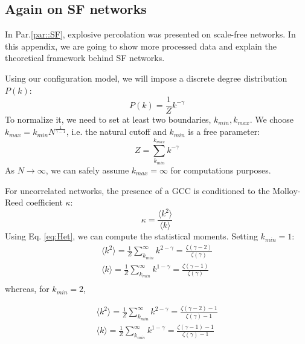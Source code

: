 \subsection{Again on SF networks}
In Par.\ref{par::SF}, explosive percolation was presented on scale-free networks. In this appendix, we are going to show more processed data and explain the theoretical framework behind SF networks.

Using our configuration model, we will impose a discrete degree distribution $P(k)$:
\begin{equation}
	P(k) = \frac{1}{Z} k^{-\gamma}
	\label{eq:Het}
\end{equation}
To normalize it, we need to set at least two boundaries, $k_{min}, k_{max}$. We choose $k_{max} = k_{min} N^{\frac{1}{\gamma - 1}}$, i.e. the natural cutoff and $k_{min}$ is a free parameter:
$$
Z = \sum_{k_{min}}^{k_{max}}k^{-\gamma} 
$$
As $N \to \infty$, we can safely assume $k_{max} = \infty$ for computations purposes. 

For uncorrelated networks, the presence of a GCC is conditioned to the Molloy-Reed coefficient $\kappa$:
$$
\kappa = \frac{\langle k^2 \rangle}{\langle k \rangle}
$$
Using Eq. \ref{eq:Het}, we can compute the statistical moments. Setting $k_{min}=1$:
\begin{equation}
	\begin{aligned}
		\langle k^2 \rangle = \frac{1}{Z} \sum_{k_{min}}^{\infty} k^{2-\gamma} = \frac{\zeta(\gamma-2)}{\zeta(\gamma)}  \\
		\langle k \rangle = \frac{1}{Z} \sum_{k_{min}}^{\infty} k^{1-\gamma} = \frac{\zeta(\gamma-1)}{\zeta(\gamma)}  \\
	\end{aligned}
\end{equation}
whereas, for $k_{min} = 2$, 

\begin{equation}
\begin{aligned}
	\langle k^2 \rangle = \frac{1}{Z} \sum_{k_{min}}^{\infty} k^{2-\gamma} = \frac{\zeta(\gamma-2)-1}{\zeta(\gamma)-1}  \\
	\langle k \rangle = \frac{1}{Z} \sum_{k_{min}}^{\infty} k^{1-\gamma} = \frac{\zeta(\gamma-1)-1}{\zeta(\gamma)-1}  \\
\end{aligned}
\end{equation}



\newpage